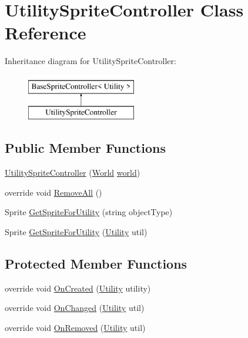 \hypertarget{class_utility_sprite_controller}{}\section{Utility\+Sprite\+Controller Class Reference}
\label{class_utility_sprite_controller}
Inheritance diagram for Utility\+Sprite\+Controller\+:\begin{figure}[H]
\begin{center}
\leavevmode
\includegraphics[height=2.000000cm]{class_utility_sprite_controller}
\end{center}
\end{figure}
\subsection*{Public Member Functions}
\begin{DoxyCompactItemize}
\item 
\hyperlink{class_utility_sprite_controller_aa31cf20282e83195b9eb7c1d99dd5124}{Utility\+Sprite\+Controller} (\hyperlink{class_world}{World} \hyperlink{class_base_sprite_controller_a593ea6a31165eff51a0acffc12ea65ca}{world})
\item 
override void \hyperlink{class_utility_sprite_controller_a3fc765c4cfe8a827e60facd93bc96b62}{Remove\+All} ()
\item 
Sprite \hyperlink{class_utility_sprite_controller_a3f73139fa127ad921d1deaddd23fc011}{Get\+Sprite\+For\+Utility} (string object\+Type)
\item 
Sprite \hyperlink{class_utility_sprite_controller_ab38a53fd0f0501ed020e7e404c6edbcd}{Get\+Sprite\+For\+Utility} (\hyperlink{class_utility}{Utility} util)
\end{DoxyCompactItemize}
\subsection*{Protected Member Functions}
\begin{DoxyCompactItemize}
\item 
override void \hyperlink{class_utility_sprite_controller_ac3dedc23461c9cfa85a0004c06fa7820}{On\+Created} (\hyperlink{class_utility}{Utility} utility)
\item 
override void \hyperlink{class_utility_sprite_controller_ad295ddcf30b5ce02b3d09fddca92b681}{On\+Changed} (\hyperlink{class_utility}{Utility} util)
\item 
override void \hyperlink{class_utility_sprite_controller_a0d649954ec9a028d600eabad29d8c91d}{On\+Removed} (\hyperlink{class_utility}{Utility} util)
\end{DoxyCompactItemize}
